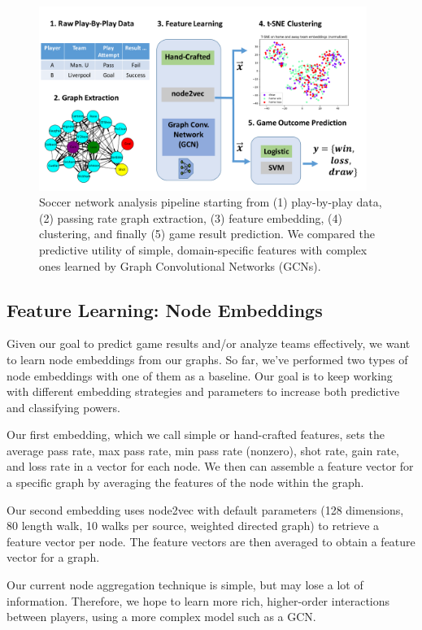 \begin{figure}[h]
  \centering
  \includegraphics[width=0.95\textwidth]{plots/soccer_block_diagram.pdf}
  \caption{Soccer network analysis pipeline starting from (1) play-by-play data, (2) passing rate graph extraction, (3) feature embedding, (4) clustering, and finally (5) game result prediction. We compared the predictive utility of simple, domain-specific features with complex ones learned by Graph Convolutional Networks (GCNs).}
  \label{fig:block_diagram}
\end{figure}

\subsection{Feature Learning: Node Embeddings}
Given our goal to predict game results and/or analyze teams effectively, we want to learn node embeddings from our graphs. So far, we've performed two types of node embeddings with one of them as a baseline. Our goal is to keep working with different embedding strategies and parameters to increase both predictive and classifying powers. 

Our first embedding, which we call simple or hand-crafted features, sets the average pass rate, max pass rate, min pass rate (nonzero), shot rate, gain rate, and loss rate in a vector for each node. We then can assemble a feature vector for a specific graph by averaging the features of the node within the graph. 

Our second embedding uses node2vec with default parameters (128 dimensions, 80 length walk, 10 walks per source, weighted directed graph) to retrieve a feature vector per node. The feature vectors are then averaged to obtain a feature vector for a graph. 

Our current node aggregation technique is simple, but may lose a lot of information. 
Therefore, we hope to learn more rich, higher-order interactions between players, using a more complex model such as a  GCN.


